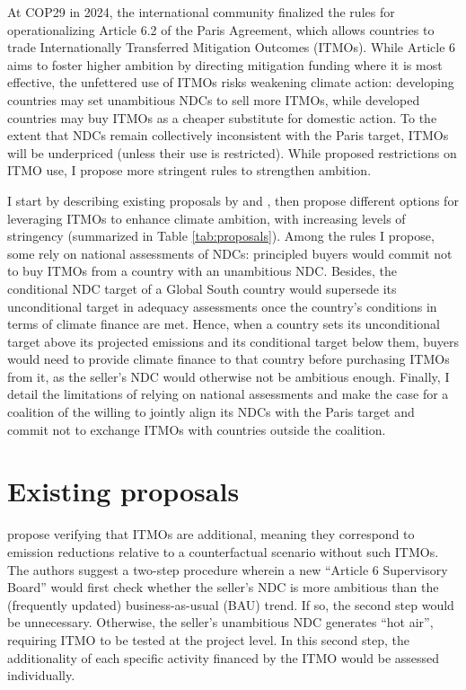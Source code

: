 ﻿\documentclass[12pt,english]{article}
\begin{document}
At COP29 in 2024, the international community finalized the rules for operationalizing Article 6.2 of the Paris Agreement, which allows countries to trade Internationally Transferred Mitigation Outcomes (ITMOs). While Article 6 aims to foster higher ambition by directing mitigation funding where it is most effective, the unfettered use of ITMOs risks weakening climate action: developing countries may set unambitious NDCs to sell more ITMOs, while developed countries may buy ITMOs as a cheaper substitute for domestic action. To the extent that NDCs remain collectively inconsistent with the Paris target, ITMOs will be underpriced (unless their use is restricted). While \cite{michaelowa_additionality_2019} proposed restrictions on ITMO use, I propose more stringent rules to strengthen ambition.

I start by describing existing proposals by \cite{michaelowa_additionality_2019} and \cite{la_hoz_theuer_when_2019}, then propose different options for leveraging ITMOs to enhance climate ambition, with increasing levels of stringency (summarized in Table \ref{tab:proposals}). Among the rules I propose, some rely on national assessments of NDCs: principled buyers would commit not to buy ITMOs from a country with an unambitious NDC. Besides, the conditional NDC target of a Global South country would supersede its unconditional target in adequacy assessments once the country's conditions in terms of climate finance are met. Hence, when a country sets its unconditional target above its projected emissions and its conditional target below them, buyers would need to provide climate finance to that country before purchasing ITMOs from it, as the seller's NDC would otherwise not be ambitious enough. Finally, I detail the limitations of relying on national assessments and make the case for a coalition of the willing to jointly align its NDCs with the Paris target and commit not to exchange ITMOs with countries outside the coalition. %
\section{Existing proposals\label{subsec:existing}}
\cite{michaelowa_additionality_2019} propose verifying that ITMOs are additional, meaning they correspond to emission reductions relative to a counterfactual scenario without such ITMOs. The authors suggest a two-step procedure wherein a new ``Article 6 Supervisory Board'' would first check whether the seller's NDC is more ambitious than the (frequently updated) business-as-usual (BAU) trend. %
If so, the second step would be unnecessary. Otherwise, the seller's unambitious NDC generates ``hot air'', requiring ITMO to be tested at the project level. In this second step, the additionality of each specific activity financed by the ITMO would be assessed individually. 
\end{document}
